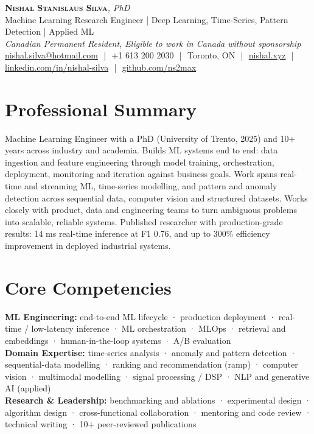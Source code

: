 \documentclass[11pt]{article}
\newcommand{\cvName}{Nishal Stanislaus Silva}
\newcommand{\cvStatus}{Canadian Permanent Resident, Eligible to work in Canada without sponsorship}
\newcommand{\cvTagline}{Machine Learning Research Engineer | Deep Learning, Time-Series, Pattern Detection | Applied ML}
\begin{document}
\pagestyle{empty}
\begin{center}
    {\LARGE \scshape \textbf{\cvName}}{\large \textit{, PhD}}
    \\[1pt]
    {\small \cvTagline}
    \\[1pt]
    {\footnotesize\textit{\cvStatus}}
    \\[1pt]
    {\small
    \href{mailto:nishal.silva@hotmail.com}{nishal.silva@hotmail.com}
    \,\,|\,\, +1 613 200 2030
    \,\,|\,\, Toronto, ON
    \,\,|\,\, \href{https://nishal.xyz}{nishal.xyz}
    \,\,|\,\, \href{https://www.linkedin.com/in/nishal-silva}{linkedin.com/in/nishal-silva}
    \,\,|\,\, \href{https://github.com/ns2max}{github.com/ns2max}}
\end{center}

\section*{Professional Summary}

Machine Learning Engineer with a PhD (University of Trento, 2025) and 10+ years across industry and academia. Builds ML systems end to end: data ingestion and feature engineering through model training, orchestration, deployment, monitoring and iteration against business goals. Work spans real-time and streaming ML, time-series modelling, and pattern and anomaly detection across sequential data, computer vision and structured datasets. Works closely with product, data and engineering teams to turn ambiguous problems into scalable, reliable systems. Published researcher with production-grade results: 14 ms real-time inference at F1 0.76, and up to 300\% efficiency improvement in deployed industrial systems.

\section*{Core Competencies}

\textbf{ML Engineering:} end-to-end ML lifecycle · production deployment · real-time / low-latency inference · ML orchestration · MLOps · retrieval and embeddings · human-in-the-loop systems · A/B evaluation\\
\textbf{Domain Expertise:} time-series analysis · anomaly and pattern detection · sequential-data modelling · ranking and recommendation (ramp) · computer vision · multimodal modelling · signal processing / DSP · NLP and generative AI (applied)\\
\textbf{Research \& Leadership:} benchmarking and ablations · experimental design · algorithm design · cross-functional collaboration · mentoring and code review · technical writing · 10+ peer-reviewed publications
\end{document}
